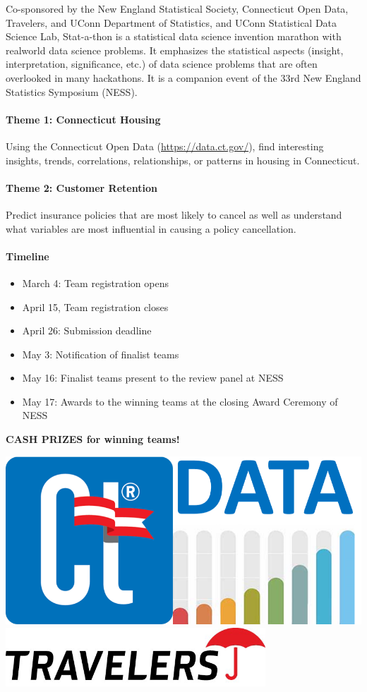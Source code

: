 \documentclass[12pt]{article}
\begin{document}
\begin{large}
Co-sponsored by the New England Statistical Society,
Connecticut Open Data, Travelers, and
UConn Department of Statistics, and UConn Statistical Data Science Lab,
Stat-a-thon is a statistical data science invention marathon with
realworld data science problems. It emphasizes the statistical aspects
(insight, interpretation, significance, etc.) of data science problems
that are often overlooked in many hackathons. It is a companion event
of the 33rd New England Statistics Symposium (NESS).


\paragraph{Theme 1: Connecticut Housing}
Using the Connecticut Open Data (\url{https://data.ct.gov/}), find
interesting insights, trends, correlations, relationships, or patterns
in housing in Connecticut.

\paragraph{Theme 2: Customer Retention}
Predict insurance policies that are most likely to cancel as well as
understand what variables are most influential in causing a policy
cancellation.

\paragraph{Timeline}
\begin{itemize}
\item 
  March 4: Team registration opens
\item
  April 15, Team registration closes
\item
  April 26: Submission deadline
\item
  May 3: Notification of finalist teams
\item
  May 16: Finalist teams present to the review panel at NESS
\item
  May 17: Awards to the winning teams at the closing Award Ceremony of NESS
\end{itemize}

\end{large}

\vfill 

\begin{center}
  {\bf\Large
    CASH PRIZES for winning teams!
  }
\end{center}


\begin{center}
  \includegraphics[width=0.26\linewidth]{ct-data}
  \hfill
\includegraphics[width=0.73\textwidth]{travelers-logo}
\end{center}
\end{document}

